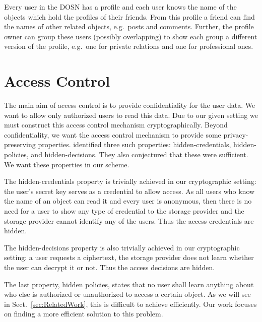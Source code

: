 Every user in the \ac{DOSN} has a profile and each user knows the name of the 
objects which hold the profiles of their friends.
From this profile a friend can find the names of other related objects, 
e.g.~posts and comments.
Further, the profile owner can group these users (possibly overlapping) to show 
each group a different version of the profile, e.g.~one for private relations 
and one for professional ones.


\section{Access Control}\label{sec:ProblemStatement}

The main aim of access control is to provide confidentiality for the user data.
We want to allow only authorized users to read this data.
Due to our given setting we must construct this access control mechanism 
cryptographically.
Beyond confidentiality, we want the access control mechanism to provide some 
privacy-preserving properties.
\citet{ppac} identified three such properties: hidden-credentials, 
hidden-policies, and hidden-decisions.
They also conjectured that these were sufficient.
We want these properties in our scheme.

The hidden-credentials property is trivially achieved in our cryptographic 
setting: the user's secret key serves as a credential to allow access.
As all users who know the name of an object can read it and every user is 
anonymous, then there is no need for a user to show any type of credential to 
the storage provider and the storage provider cannot identify any of the users.
Thus the access credentials are hidden.

The hidden-decisions property is also trivially achieved in our cryptographic 
setting: a user requests a ciphertext, the storage provider does not learn 
whether the user can decrypt it or not.
Thus the access decisions are hidden.

The last property, hidden policies, states that no user shall learn anything 
about who else is authorized or unauthorized to access a certain object.
As we will see in Sect.~\ref{sec:RelatedWork}, this is difficult to achieve 
efficiently.
Our work focuses on finding a more efficient solution to this problem.


